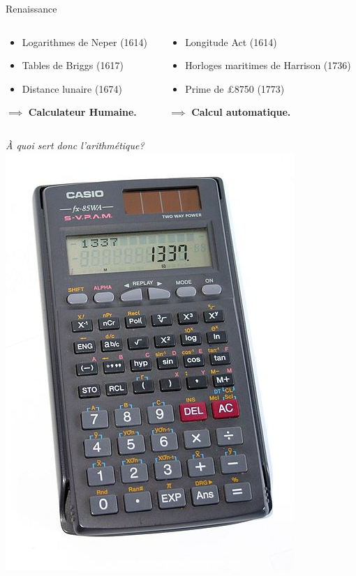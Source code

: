 \begin{frame}{Renaissance}
\begin{columns}
\begin{column}{0.40\linewidth}
	\end{column}
\end{columns}
\begin{columns}
	\begin{column}{0.49\linewidth}
		\begin{itemize}
			\item Logarithmes de Neper (1614)
			\item Tables de Briggs (1617)
			\item Distance lunaire (1674)
		\end{itemize}
		$\implies$ \textbf{Calculateur Humaine.}
	\end{column}
	\begin{column}{0.49\linewidth}
		\begin{itemize}
			\item Longitude Act (1614) 
			\item Horloges maritimes de Harrison (1736)
			\item Prime de £8750 (1773)
		\end{itemize}
		$\implies$ \textbf{Calcul automatique.}
	\end{column}
\end{columns}
\end{frame}
\begin{frame}
\centering
\huge \emph{À quoi sert donc l'arithmétique?}
\vfill
\centering
\includegraphics[height=0.5\paperheight]{../resources/illustrations/calculator} \\
\vfill
\end{frame}
